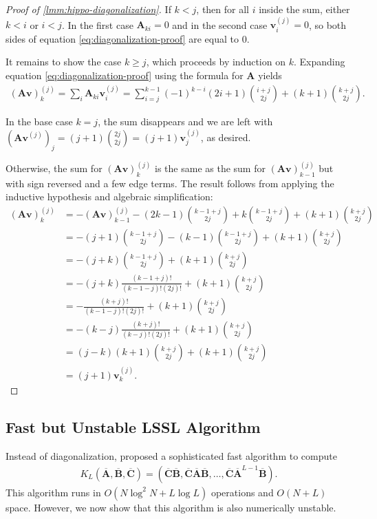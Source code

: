\begin{proof}[Proof of \cref{lmm:hippo-diagonalization}]
  If \( k < j \), then for all \( i \) inside the sum, either \( k < i \) or \( i < j \).
  In the first case \( \bm{A}_{ki} = 0 \) and in the second case \( \bm{v}^{(j)}_i = 0 \),
  so both sides of equation \eqref{eq:diagonalization-proof} are equal to \( 0 \).

  It remains to show the case \( k \ge j \), which proceeds by induction on \( k \).
  Expanding equation \eqref{eq:diagonalization-proof} using the formula for \( \bm{A} \) yields
  \begin{align*}
    (\bm{A}\bm{v})^{(j)}_k = \sum_i \bm{A}_{ki} \bm{v}^{(j)}_{i}
    = \sum_{i=j}^{k-1} (-1)^{k-i} (2i+1) \binom{i+j}{2j} + (k+1) \binom{k+j}{2j}.
  \end{align*}

  In the base case \( k = j \), the sum disappears and we are left with \( (\bm{A}\bm{v}^{(j)})_j = (j+1) \binom{2j}{2j} = (j+1) \bm{v}^{(j)}_j \), as desired.

  Otherwise, the sum for \( (\bm{A}\bm{v})^{(j)}_{k} \) is the same as the sum for \( (\bm{A}\bm{v})^{(j)}_{k-1} \) but with sign reversed and a few edge terms.
  The result follows from applying the inductive hypothesis and algebraic simplification:
  \begin{align*}
    (\bm{A}\bm{v})^{(j)}_{k}
    &= -(\bm{A}\bm{v})^{(j)}_{k-1} - (2k-1) \binom{k-1+j}{2j} + k\binom{k-1+j}{2j} + (k+1)\binom{k+j}{2j}
    \\&= -(j+1)\binom{k-1+j}{2j} - (k-1)\binom{k-1+j}{2j} + (k+1)\binom{k+j}{2j}
    \\&= -(j+k)\binom{k-1+j}{2j} + (k+1)\binom{k+j}{2j}
    \\&= -(j+k)\frac{(k-1+j)!}{(k-1-j)!(2j)!} + (k+1)\binom{k+j}{2j}
    \\&= -\frac{(k+j)!}{(k-1-j)!(2j)!} + (k+1)\binom{k+j}{2j}
    \\&= -(k-j)\frac{(k+j)!}{(k-j)!(2j)!} + (k+1)\binom{k+j}{2j}
    \\&= (j-k)(k+1)\binom{k+j}{2j} + (k+1)\binom{k+j}{2j}
    \\&= (j+1)\bm{v}^{(j)}_k
    .
  \end{align*}

\end{proof}

\subsection{Fast but Unstable LSSL Algorithm}

Instead of diagonalization,
\citet[Theorem 2]{gu2021lssl} proposed a sophisticated fast algorithm to compute
\begin{align*}
  K_L(\bm{\overline{A}}, \bm{\overline{B}}, \bm{\overline{C}}) = (\bm{\overline{C}}\bm{\overline{B}}, \bm{\overline{C}}\bm{\overline{A}}\bm{\overline{B}}, \dots, \bm{\overline{C}}\bm{\overline{A}}^{L-1}\bm{\overline{B}}).
\end{align*}
This algorithm runs in \( O(N\log^2 N + L\log L) \) operations and \( O(N+L) \) space.
However, we now show that this algorithm is also numerically unstable.

